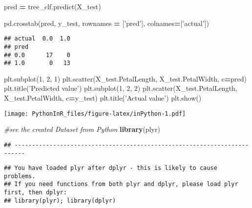 \documentclass[]{article}
\newenvironment{Shaded}{\begin{snugshade}}{\end{snugshade}}
\newcommand{\CommentTok}[1]{\textcolor[rgb]{0.56,0.35,0.01}{\textit{#1}}}
\newcommand{\DecValTok}[1]{\textcolor[rgb]{0.00,0.00,0.81}{#1}}
\newcommand{\KeywordTok}[1]{\textcolor[rgb]{0.13,0.29,0.53}{\textbf{#1}}}
\newcommand{\NormalTok}[1]{#1}
\newcommand{\OperatorTok}[1]{\textcolor[rgb]{0.81,0.36,0.00}{\textbf{#1}}}
\newcommand{\StringTok}[1]{\textcolor[rgb]{0.31,0.60,0.02}{#1}}
\begin{document}
\begin{Shaded}
\begin{Highlighting}[]
\NormalTok{pred }\OperatorTok{=}\NormalTok{ tree_clf.predict(X_test)}

\NormalTok{pd.crosstab(pred, y_test, rownames }\OperatorTok{=}\NormalTok{ [}\StringTok{'pred'}\NormalTok{], colnames}\OperatorTok{=}\NormalTok{[}\StringTok{'actual'}\NormalTok{])}
\end{Highlighting}
\end{Shaded}

\begin{verbatim}
## actual  0.0  1.0
## pred            
## 0.0      17    0
## 1.0       0   13
\end{verbatim}

\begin{Shaded}
\begin{Highlighting}[]
\NormalTok{plt.subplot(}\DecValTok{1}\NormalTok{, }\DecValTok{2}\NormalTok{, }\DecValTok{1}\NormalTok{)}
\NormalTok{plt.scatter(X_test.PetalLength, X_test.PetalWidth, c}\OperatorTok{=}\NormalTok{pred)}
\NormalTok{plt.title(}\StringTok{'Predicted value'}\NormalTok{)}
\NormalTok{plt.subplot(}\DecValTok{1}\NormalTok{, }\DecValTok{2}\NormalTok{, }\DecValTok{2}\NormalTok{)}
\NormalTok{plt.scatter(X_test.PetalLength, X_test.PetalWidth, c}\OperatorTok{=}\NormalTok{y_test)}
\NormalTok{plt.title(}\StringTok{'Actual value'}\NormalTok{)}
\NormalTok{plt.show()}
\end{Highlighting}
\end{Shaded}

\texttt{[image: PythonInR\_files/figure-latex/inPython-1.pdf]}

\begin{Shaded}
\begin{Highlighting}[]
\CommentTok{#see the created Dataset from Python}
\KeywordTok{library}\NormalTok{(plyr)}
\end{Highlighting}
\end{Shaded}

\begin{verbatim}
## -------------------------------------------------------------------------
\end{verbatim}

\begin{verbatim}
## You have loaded plyr after dplyr - this is likely to cause problems.
## If you need functions from both plyr and dplyr, please load plyr first, then dplyr:
## library(plyr); library(dplyr)
\end{verbatim}
\end{document}
